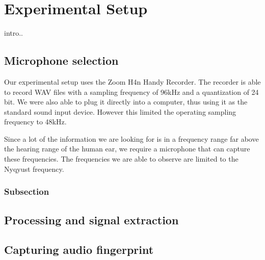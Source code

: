 \chapter{Experimental Setup}
\label{chp:experimental_setup} 

intro..

\section{Microphone selection}\label{sec:microphone_selection}

Our experimental setup uses the Zoom H4n Handy Recorder. 
The recorder is able to record WAV files with a sampling frequency of 96kHz and a quantization of 24 bit. We were also able to plug it directly into a computer, thus using it as the standard sound input device. 
However this limited the operating sampling frequency to 48kHz.

Since a lot of the information we are looking for is in a frequency range far above the hearing range of the human ear, we require a microphone that can capture these frequencies. 
The frequencies we are able to observe are limited to the Nyqyust frequency.

\subsection{Subsection}\label{sec:first_ssection}


\section{Processing and signal extraction}\label{sec:processing_signal_extraction}


\section{Capturing audio fingerprint}\label{sec:capturing_audio_fingerprint}
